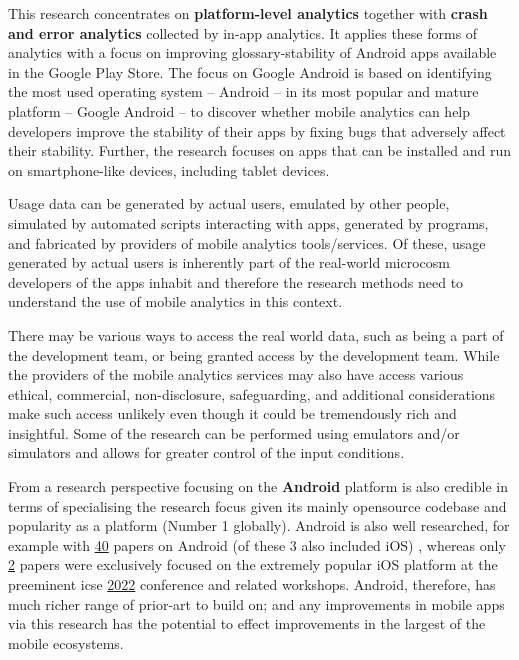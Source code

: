 This research concentrates on \textbf{platform-level analytics} together with \textbf{crash and error analytics} collected by in-app analytics. It applies these forms of analytics with a focus on improving \gls{glossary-stability} of Android apps available in the Google Play Store. The focus on Google Android is based on identifying the most used operating system -- Android -- in its most popular and mature platform -- Google Android -- to discover whether mobile analytics can help developers improve the stability of their apps by fixing bugs that adversely affect their stability. Further, the research focuses on apps that can be installed and run on smartphone-like devices, including tablet devices.

\begin{kaobox}[frametitle=Usage data]
Usage data can be generated by actual users, emulated by other people, simulated by automated scripts interacting with apps, generated by programs, and fabricated by providers of mobile analytics tools/services. Of these, usage generated by actual users is inherently part of the real-world microcosm developers of the apps inhabit and therefore the research methods need to understand the use of mobile analytics in this context. 

There may be various ways to access the real world data, such as being a part of the development team, or being granted access by the development team. While the providers of the mobile analytics services may also have access various ethical, commercial, non-disclosure, safeguarding, and additional considerations make such access unlikely even though it could be tremendously rich and insightful. Some of the research can be performed using emulators and/or simulators and allows for greater control of the input conditions.
\end{kaobox}

From a research perspective focusing on the \textbf{Android} platform is also credible in terms of specialising the research focus given its mainly opensource codebase and popularity as a platform (Number 1 globally). Android is also well researched, for example with 
\href{https://conf.researchr.org/search/icse-2022/android/events}{40} papers on Android (of these 3 also included iOS) %
, whereas only \href{https://conf.researchr.org/search/icse-2022/ios/events}{2} %
papers were exclusively focused on the extremely popular iOS platform at the preeminent \gls{icse} \href{https://conf.researchr.org/home/icse-2022}{2022} conference and related workshops. Android, therefore, has much richer range of prior-art to build on; and any improvements in mobile apps via this research has the potential to effect improvements in the largest of the mobile ecosystems.

